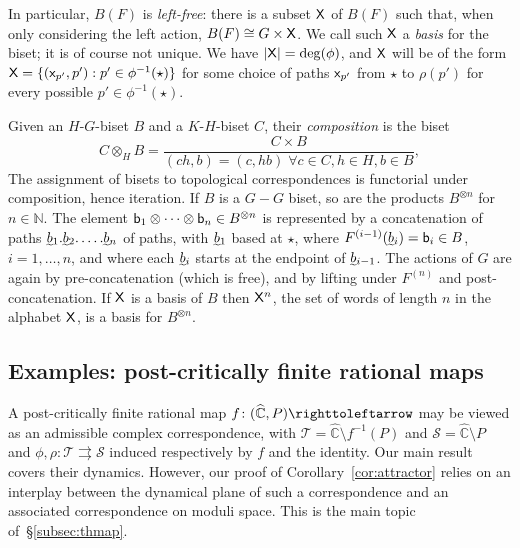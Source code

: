 \documentclass{amsart}
\newcommand\C{{\mathbb{C}}}
\newcommand\N{{\mathbb{N}}}
\newcommand{\rs}{\widehat{\C}}
\theoremstyle{definition}
\theoremstyle{remark}
\newcommand{\sfX}{{\sf X}}
\newcommand{\sfx}{{\sf x}}
\newcommand{\sfb}{{\sf b}}
\newcommand{\cT}{\mathcal{T}}
\newcommand{\cS}{\mathcal{S}}
\begin{document}
In particular, $B(F)$ is \emph{left-free}: there is a subset $\sfX$ of $B(F)$ such that, when only considering the left action, $B(F)\cong G\times \sfX$.  We call such $\sfX$ a \emph{basis} for the biset; it is of course not unique. We have $|\sfX|=\deg(\phi)$, and $\sfX$ will be of the form $\sfX=\{(\sfx_{p'},p'):p'\in \phi^{-1}(\star)\}$ for some choice of paths $\sfx_{p'}$ from $\star$ to $\rho(p')$ for every possible $p'\in \phi^{-1}(\star)$.

Given an $H$-$G$-biset $B$ and a $K$-$H$-biset $C$, their \emph{composition} is the biset
\[C\otimes_H B=\frac{C\times B}{(c h,b)=(c,h b)\;\forall c\in C,h\in H,b\in B},\]
The assignment of bisets to topological correspondences is functorial under composition, hence iteration. If $B$ is a $G-G$ biset, so are the products $B^{\otimes n}$ for $n\in \N$.  The element $\sfb_1 \otimes \cdots \otimes \sfb_n\in B^{\otimes n}$ is represented by a concatenation of paths $\undertilde{b}_1.\undertilde{b}_2.\ldots .\undertilde{b}_n$ of paths, with $\undertilde{b}_1$ based at $\star$, where $F^{(i-1)}(\undertilde{b}_i)=\sfb_i\in B$, $i=1, \ldots, n$, and where each $\undertilde{b}_i$ starts at the endpoint of $\undertilde{b}_{i-1}$.  The actions of $G$ are again by pre-concatenation (which is free), and by lifting under $F^{(n)}$ and post-concatenation. If $\sfX$ is a basis of $B$ then $\sfX^n$, the set of words of length $n$ in the alphabet $\sfX$, is a basis for $B^{\otimes n}$. 

\subsection{Examples: post-critically finite rational maps}\label{subsecn:pcf}
A post-critically finite rational map $f\colon(\rs,P)\righttoleftarrow$ may be viewed as an admissible complex correspondence, with $\cT=\rs\setminus f^{-1}(P)$ and $\cS=\rs\setminus P$ and $\phi,\rho\colon\cT\rightrightarrows\cS$ induced respectively by $f$ and the identity. Our main result covers their dynamics. However, our proof of Corollary~\ref{cor:attractor} relies on an interplay between the dynamical plane of such a correspondence and an associated correspondence on moduli space. This is the main topic of~\S\ref{subsec:thmap}.  
\end{document}
